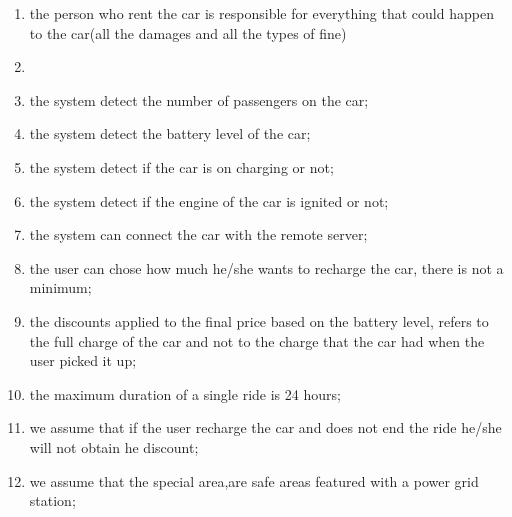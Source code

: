 \begin{enumerate}
	\item the person who rent the car is responsible for everything that could happen to the car(all the damages and all the types of fine)
	\item 
	\item the system detect the number of passengers on the car;
	\item the system detect the battery level of the car;
	\item the system detect if the car is on charging or not;
	\item the system detect if the engine of the car is ignited or not;
	\item the system can connect the car with the remote server;
	\item the user can chose how much he/she wants to recharge the car, there is not a minimum;
	\item the discounts applied to the final price based on the battery level, refers to the full charge of the car and not to the charge that the car had when the user picked it up;
	\item the maximum duration of a single ride is 24 hours;
	\item we assume that if the user recharge the car and does not end the ride he/she will not obtain he discount;
	\item we assume that the special area,are safe areas featured with a power grid station;
\end{enumerate}